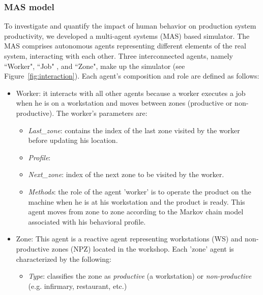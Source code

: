 \documentclass[review,12pt, 3p, times]{elsarticle}
\begin{document}
\subsubsection{MAS model}
To investigate and quantify the impact of human behavior on production system productivity, we developed a multi-agent systems (MAS) based simulator. The MAS comprises autonomous agents representing different elements of the real system, interacting with each other. Three interconnected agents, namely “Worker", “Job" , and “Zone", make up the simulator (see Figure~\ref{fig:interaction}). Each agent's composition and role are defined as follows: 
\begin{itemize}
    \item Worker: it interacts with all other agents because a worker executes a job when he is on a workstation and moves between zones (productive or non-productive). The worker's parameters are:
    \begin{itemize}
        \item \textit{Last\_zone}: contains the index of the last zone visited by the worker before updating his location.
	\item \textit{Profile}: 
        \item \textit{Next\_zone}: index of the next zone to be visited by the worker.
        \item \textit{Methods}: the role of the agent 'worker' is to operate the product on the machine when he is at his workstation and the product is ready. This agent moves from zone to zone according to the Markov chain model associated with his behavioral profile.  
    \end{itemize}
    \item Zone: This agent is a reactive agent representing workstations (WS) and non-productive zones (NPZ) located in the workshop. Each 'zone' agent is characterized by the following:
    \begin{itemize}
        \item\textit{Type}: classifies the zone as \textit{productive} (a workstation) or \textit{non-productive} (e.g. infirmary, restaurant, etc.)

\end{itemize}
\end{itemize}
\end{document}
